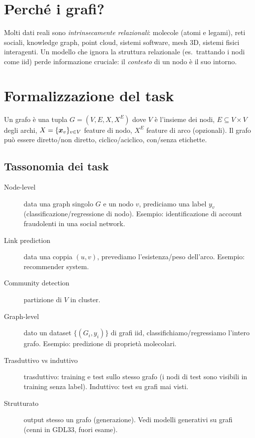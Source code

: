 \section{Perché i grafi?}

Molti dati reali sono \emph{intrinsecamente relazionali}: molecole (atomi e legami), reti sociali, knowledge graph, point cloud, sistemi software, mesh 3D, sistemi fisici interagenti. Un modello che ignora la struttura relazionale (es.\ trattando i nodi come iid) perde informazione cruciale: il \emph{contesto} di un nodo è il suo intorno.

\section{Formalizzazione del task}

\begin{definition}[Grafo]
Un grafo è una tupla $G = (V, E, X, X^E)$ dove $V$ è l'insieme dei nodi, $E \subseteq V \times V$ degli archi, $X = \{\bm{x}_v\}_{v\in V}$ feature di nodo, $X^E$ feature di arco (opzionali). Il grafo può essere diretto/non diretto, ciclico/aciclico, con/senza etichette.
\end{definition}

\subsection{Tassonomia dei task}

\begin{description}
  \item[Node-level] data una graph singolo $G$ e un nodo $v$, prediciamo una label $y_v$ (classificazione/regressione di nodo). Esempio: identificazione di account fraudolenti in una social network.
  \item[Link prediction] data una coppia $(u,v)$, prevediamo l'esistenza/peso dell'arco. Esempio: recommender system.
  \item[Community detection] partizione di $V$ in cluster.
  \item[Graph-level] dato un dataset $\{(G_i, y_i)\}$ di grafi iid, classifichiamo/regressiamo l'intero grafo. Esempio: predizione di proprietà molecolari.
  \item[Trasduttivo vs induttivo] trasduttivo: training e test sullo stesso grafo (i nodi di test sono visibili in training senza label). Induttivo: test su grafi mai visti.
  \item[Strutturato] output stesso un grafo (generazione). Vedi modelli generativi su grafi (cenni in GDL33, fuori esame).
\end{description}

